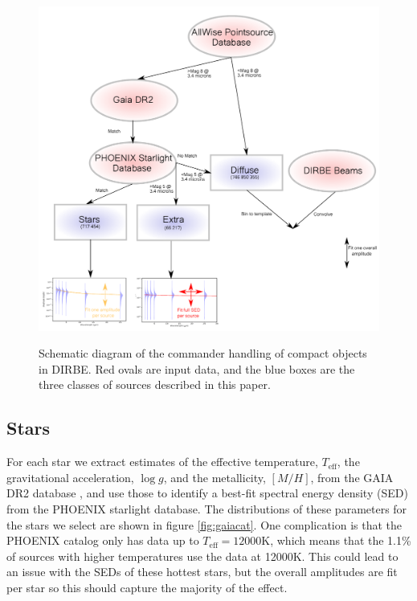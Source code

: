 \documentclass{aa}
\begin{document}
\begin{figure}
  \centering
  \includegraphics[width=\textwidth]{figs/diagram/dirbe_diagram.pdf}\\
  \caption{Schematic diagram of the commander handling of compact objects in DIRBE. Red ovals are input data, and the blue boxes are the three classes of sources described in this paper. }
  \label{fig:diagram}
\end{figure}

\subsection{Stars}

\label{sec:starmodel}

For each star we extract estimates of the effective temperature, $T_{\mathrm{eff}}$, the gravitational acceleration, $\log g$, and the metallicity, $[M/H]$, from the GAIA DR2 database \citep{gaiaCat}, and use those to identify a best-fit spectral energy density (SED) from the PHOENIX starlight database. The distributions of these parameters for the stars we select are shown in figure \ref{fig:gaiacat}. One complication is that the PHOENIX catalog only has data up to $T_{\mathrm{eff}} = 12000$K, which means that the 1.1\% of sources with higher temperatures use the data at 12000K. This could lead to an issue with the SEDs of these hottest stars, but the overall amplitudes are fit per star so this should capture the majority of the effect.
\end{document}
